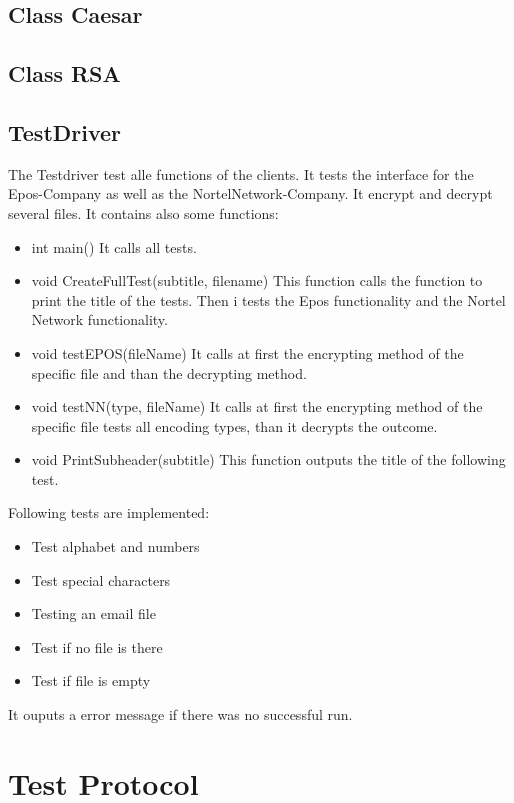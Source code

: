 \subsection{Class Caesar}
\subsection{Class RSA}

\subsection{TestDriver}
The Testdriver test alle functions of the clients. It tests the interface for the Epos-Company as well as the NortelNetwork-Company. It encrypt and decrypt several files. It contains also some functions:
\begin{itemize}
\item int main()
\subitem It calls all tests.

\item void CreateFullTest(subtitle, filename)
\subitem This function calls the function to print the title of the tests. Then i tests the Epos functionality and the Nortel Network functionality.

\item void testEPOS(fileName)
\subitem It calls at first the encrypting method of the specific file and than the decrypting method.

\item void testNN(type, fileName)
\subitem It calls at first the encrypting method of the specific file tests all encoding types, than it decrypts the outcome.

\item void PrintSubheader(subtitle)
\subitem This function outputs the title of the following test.
\end{itemize}
Following tests are implemented:
\begin{itemize}
\item Test alphabet and numbers
\item Test special characters
\item Testing an email file
\item Test if no file is there
\item Test if file is empty
\end{itemize}
It ouputs a error message if there was no successful run.

\newpage
\section{Test Protocol}

